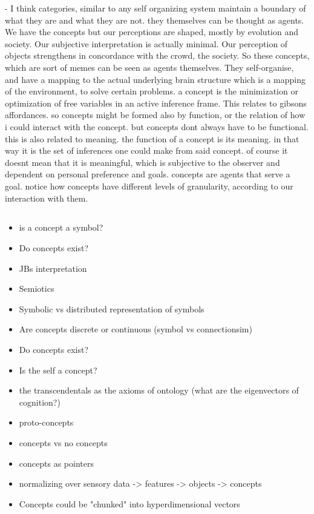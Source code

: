 - I think categories, similar to any self organizing system maintain a boundary of what they are and what they are not. they themselves can be thought as agents. We have the concepts but our perceptions are shaped, mostly by evolution and society. Our subjective interpretation is actually minimal. Our perception of objects strengthens in concordance with the crowd, the society. So these concepts, which are sort of memes can be seen as agents themselves. They self-organise, and have a mapping to the actual underlying brain structure which is a mapping of the environment, to solve certain problems. a concept is the minimization or optimization of free variables in an active inference frame. This relates to gibsons affordances. so concepts might be formed also by function, or the relation of how i could interact with the concept. but concepts dont always have to be functional. this is also related to meaning. the function of a concept is its meaning. in that way it is the set of inferences one could make from said concept. of course it doesnt mean that it is meaningful, which is subjective to the observer and dependent on personal preference and goals. concepts are agents that serve a goal. notice how concepts have different levels of granularity, according to our interaction with them. 







\subsection{}




\begin{itemize}
    \item is a concept a symbol? 
    \item Do concepts exist?
    \item JBs interpretation
    \item Semiotics
    \item Symbolic vs distributed representation of symbols
    \item Are concepts discrete or continuous (symbol vs connectionsim)
    \item Do concepts exist?
    \item Is the self a concept?
\end{itemize}


\begin{itemize}
    \item the transcendentals as the axioms of ontology (what are the eigenvectors of cognition?)
    \item proto-concepts
    \item concepts vs no concepts
    \item concepts as pointers
    \item normalizing over sensory data -> features -> objects -> concepts 
    \item Concepts could be "chunked" into hyperdimensional vectors
\end{itemize}

